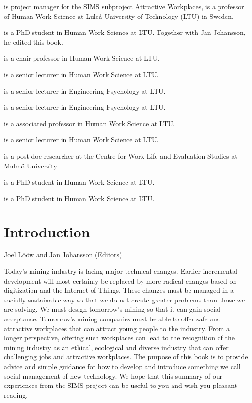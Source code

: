 \documentclass[
  12pt,
]{scrbook}
\providecommand{\tightlist}{%
  \setlength{\itemsep}{0pt}\setlength{\parskip}{0pt}}
\newenvironment{chap-auth}
{\vspace{1cm}\begin{center}\begin{flushright}\sffamily\noindent}
  {\end{flushright}\end{center}\vspace{1cm}}
\begin{document}
\begin{description}
\tightlist
\item[Jan Johansson]
is project manager for the SIMS subproject Attractive Workplaces, is a
professor of Human Work Science at Luleå University of Technology (LTU)
in Sweden.
\item[Joel Lööw]
is a PhD student in Human Work Science at LTU. Together with Jan
Johansson, he edited this book.
\item[Lena Abrahamson]
is a chair professor in Human Work Science at LTU.
\item[Eira Andersson]
is a senior lecturer in Human Work Science at LTU.
\item[Lisa Öman Ekervhén]
is a senior lecturer in Engineering Psychology at LTU.
\item[Camilla Grane]
is a senior lecturer in Engineering Psychology at LTU.
\item[Bo Johansson]
is a associated professor in Human Work Science at LTU.
\item[Magnus Nygren]
is a senior lecturer in Human Work Science at LTU.
\item[Lisa Ringblom]
is a post doc researcher at the Centre for Work Life and Evaluation
Studies at Malmö University.
\item[Eugenia Segerstedt]
is a PhD student in Human Work Science at LTU.
\item[Erik Sundström]
is a PhD student in Human Work Science at LTU.
\end{description}

\hypertarget{introduction}{%
\chapter*{Introduction}\label{introduction}}

\pagestyle{myheadings}

\begin{chap-auth}
Joel Lööw and Jan Johansson (Editors)
\end{chap-auth}

Today's mining industry is facing major technical changes. Earlier incremental development will most certainly be replaced by more radical changes based on digitization and the Internet of Things. These changes must be managed in a socially sustainable way so that we do not create greater problems than those we are solving. We must design tomorrow's mining so that it can gain social acceptance. Tomorrow's mining companies must be able to offer safe and attractive workplaces that can attract young people to the industry. From a longer perspective, offering such workplaces can lead to the recognition of the mining industry as an ethical, ecological and diverse industry that can offer challenging jobs and attractive workplaces. The purpose of this book is to provide advice and simple guidance for how to develop and introduce something we call social management of new technology. We hope that this summary of our experiences from the SIMS project can be useful to you and wish you pleasant reading.
\end{document}
